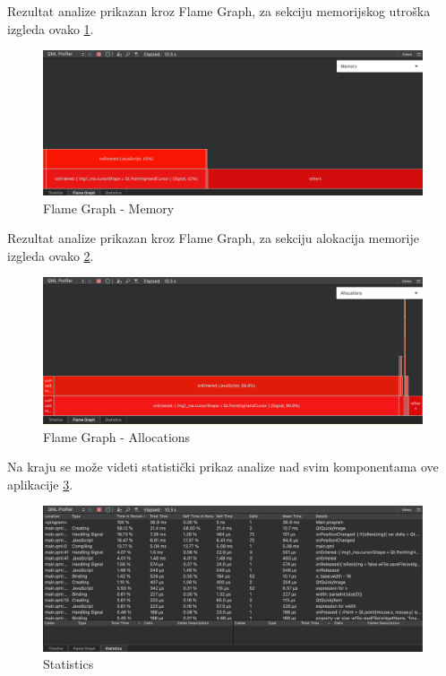 \documentclass[a4paper]{article}
\begin{document}
Rezultat analize prikazan kroz Flame Graph, za sekciju memorijskog utroška izgleda ovako \ref{fig: qml-06}.

\begin{figure}[h!]
\begin{center}
\includegraphics[scale=0.30]{qml-prof-06.png}
\end{center}
\caption{Flame Graph - Memory}
\label{fig: qml-06}
\end{figure}

Rezultat analize prikazan kroz Flame Graph, za sekciju alokacija memorije izgleda ovako \ref{fig: qml-07}.

\begin{figure}[h!]
\begin{center}
\includegraphics[scale=0.30]{qml-prof-07.png}
\end{center}
\caption{Flame Graph - Allocations}
\label{fig: qml-07}
\end{figure}

Na kraju se može videti statistički prikaz analize nad svim komponentama ove aplikacije \ref{fig: qml-08}.

\begin{figure}[h!]
\begin{center}
\includegraphics[scale=0.30]{qml-prof-08.png}
\end{center}
\caption{Statistics}
\label{fig: qml-08}
\end{figure}
\end{document}
